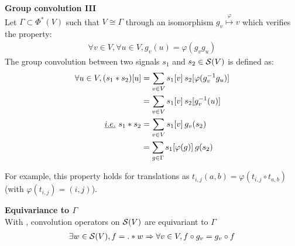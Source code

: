 \begin{definition}\textbf{Group convolution III}\\
Let $\Gamma \subset \Phi^*(V)$ such that $V \cong \Gamma$ through an isomorphism $g_v \overset{\varphi}\mapsto v$ which verifies the property: 
\begin{gather*}
\forall v \in V, \forall u \in V, g_v(u) = \varphi(g_vg_u) \tag{P}\label{eq:P}
\end{gather*}
The group convolution between two signals $s_1$ and $s_2 \in \mathcal{S}(V)$ is defined as:
\begin{align*}
\forall u \in V, (s_1 \ast s_2) [u] & = \displaystyle \sum_{v \in V} s_1[v] \h{2} s_2[\varphi(g_v^{-1}g_u)]\\
& = \displaystyle \sum_{v \in V} s_1[v] \h{2} s_2[g_v^{-1}(u)]\\
\ie s_1 \ast s_2 & = \displaystyle \sum_{v \in V} s_1[v] \h{2} g_v(s_2)\\
& = \displaystyle \sum_{g \in \Gamma} s_1[\varphi(g)] \h{2} g(s_2) %
\end{align*}
\label{def:conv3}
\end{definition}

\begin{remark}
For example, this property holds for translations as $t_{i,j}(a,b) = \varphi(t_{i,j} \circ t_{a,b})$ (with $\varphi(t_{i,j}) = (i,j)$).
\end{remark}

\begin{proposition}\textbf{Equivariance to $\Gamma$}\\
With , convolution operators on $\mathcal{S}(V)$ are equivariant to $\Gamma$ \ie
\begin{gather*}
\exists w \in \mathcal{S}(V), f = . \ast w \Rightarrow \forall v \in V, f \circ g_v = g_v \circ f
\end{gather*}
\label{prop:equi}
\end{proposition}


